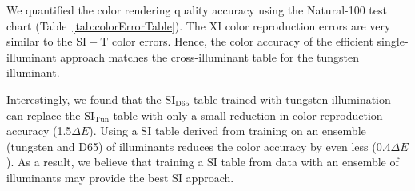 \documentclass[]{spie}
\newcommand{\XI}{\mathrm{XI}}
\newcommand{\SI}{\mathrm{SI}}
\newcommand{\SIT}{\mathrm{SI_{Tun}}}
\newcommand{\SID}{\mathrm{SI_{D65}}}
\newcommand{\SIGT}{\mathrm{SI-T}}
\begin{document}
We quantified the color rendering quality accuracy using the Natural-100 test chart (Table~\ref{tab:colorErrorTable}). The $\XI$ color reproduction errors are very similar to the $\SIGT$ color errors. Hence, the color accuracy of the efficient single-illuminant approach matches the cross-illuminant table for the tungsten illuminant.

Interestingly, we found that the $\SID$ table trained with tungsten illumination can replace the $\SIT$ table with only a small reduction in color reproduction accuracy (1.5$\Delta E$). Using a $\SI$ table derived from training on an ensemble (tungsten and D65) of illuminants reduces the color accuracy by even less (0.4$\Delta E$). As a result, we believe that training a $\SI$ table from data with an ensemble of illuminants may provide the best $\SI$ approach.
\end{document}
